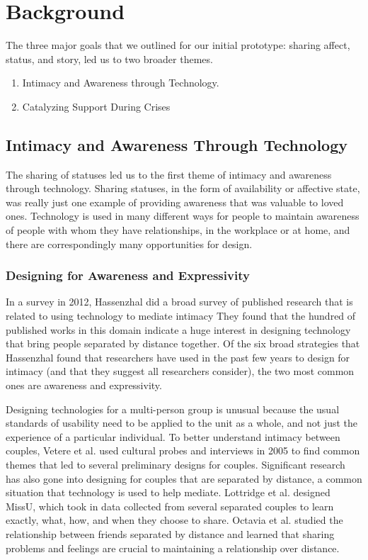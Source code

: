 \chapter{Background}
  The three major goals that we outlined for our initial prototype:
  sharing affect, status, and story, led us to two broader themes.
  \begin{enumerate}
  \item Intimacy and Awareness through Technology.
  \item Catalyzing Support During Crises
  \end{enumerate}

\section{Intimacy and Awareness Through Technology}
  The sharing of statuses led us to the first theme of
  intimacy and awareness through technology.
  Sharing statuses,
  in the form of availability or affective state,
  was really just one example of providing awareness that was valuable to loved ones.
  Technology is used in many different ways for people to maintain
  awareness of people with whom they have relationships,
  in the workplace or at home,
  and there are correspondingly many opportunities for design.

  \subsection{Designing for Awareness and Expressivity}
    In a survey in 2012, Hassenzhal did a broad survey of published research
    that is related to using technology to mediate intimacy
    \cite{hassenzhal12}
    They found that the hundred of published works in this domain indicate a
    huge interest in designing technology that bring people separated by distance together.
    Of the six broad strategies that Hassenzhal found
    that researchers have used in the past few years to design for intimacy
    (and that they suggest all researchers consider),
    the two most common ones are awareness and expressivity.

    Designing technologies for a multi-person group is unusual because the usual
    standards of usability need to be applied to the unit as a whole, and not just
    the experience of a particular individual. \cite{neustaedter12}
    To better understand intimacy between couples,
    Vetere et al. used cultural probes and interviews in 2005 to find
    common themes that led to several preliminary designs for couples.
    Significant research has also gone into designing for couples that are
    separated by distance,
    a common situation that technology is used to help mediate.
    \cite{vetere05}
    Lottridge et al. designed MissU, which took in data collected from several separated couples
    to learn exactly, what, how, and when they choose to share.
    \cite{lottridge09}
    Octavia et al. studied the relationship between friends separated by distance
    and learned that sharing problems and feelings are crucial to
    maintaining a relationship over distance.
    \cite{octavia07}


